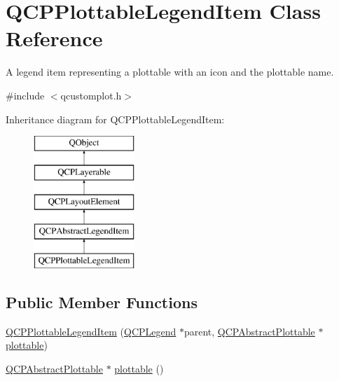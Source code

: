 \hypertarget{class_q_c_p_plottable_legend_item}{}\section{Q\+C\+P\+Plottable\+Legend\+Item Class Reference}
\label{class_q_c_p_plottable_legend_item}


A legend item representing a plottable with an icon and the plottable name.  




{\ttfamily \#include $<$qcustomplot.\+h$>$}

Inheritance diagram for Q\+C\+P\+Plottable\+Legend\+Item\+:\begin{figure}[H]
\begin{center}
\leavevmode
\includegraphics[height=5.000000cm]{class_q_c_p_plottable_legend_item}
\end{center}
\end{figure}
\subsection*{Public Member Functions}
\begin{DoxyCompactItemize}
\item 
\hyperlink{class_q_c_p_plottable_legend_item_ac1072591fe409d3dabad51b23ee4d6c5}{Q\+C\+P\+Plottable\+Legend\+Item} (\hyperlink{class_q_c_p_legend}{Q\+C\+P\+Legend} $\ast$parent, \hyperlink{class_q_c_p_abstract_plottable}{Q\+C\+P\+Abstract\+Plottable} $\ast$\hyperlink{class_q_c_p_plottable_legend_item_af29e9a2c60b4cba0cac2447b8af7b488}{plottable})
\item 
\hyperlink{class_q_c_p_abstract_plottable}{Q\+C\+P\+Abstract\+Plottable} $\ast$ \hyperlink{class_q_c_p_plottable_legend_item_af29e9a2c60b4cba0cac2447b8af7b488}{plottable} ()
\end{DoxyCompactItemize}

